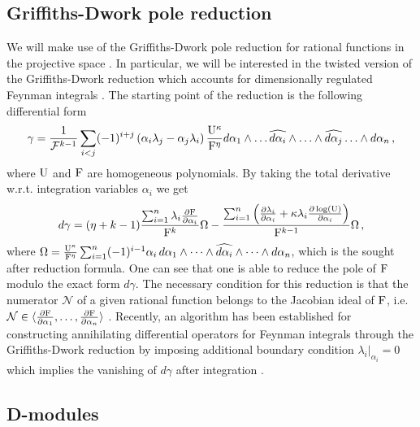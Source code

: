\documentclass[11pt]{article}
\begin{document}
\subsection{Griffiths-Dwork pole reduction}
We will make use of the Griffiths-Dwork pole reduction for rational functions in the projective space \cite{Griffiths_1969,Dwork1962,Dwork1964}. In particular, we will be interested in the twisted version of the Griffiths-Dwork reduction which accounts for dimensionally regulated Feynman integrals \cite{delaCruz:2024xit}.
The starting point of the reduction is the following differential form
\begin{align}
\gamma = \frac{1}{\mathcal{F}^{k-1}} \sum_{i<j} (-1)^{i+j} \left( \alpha_{i}\lambda_{j} - \alpha_{j}\lambda_{i} \right) \frac{{\rm U}^{\kappa}}{{\rm F}^{\eta}}  d\alpha_{1} \wedge \hdots \widehat{d\alpha_{i}} \wedge \hdots \wedge \widehat{d\alpha_{j}} \hdots \wedge d\alpha_{n} \,,   
\end{align}
where $\rm U$ and $\rm F$ are homogeneous polynomials.
By taking the total derivative w.r.t. integration variables $\alpha_{i}$ we get
\begin{align}\label{eq:twisted_griffiths}
d \gamma = (\eta + k-1)\frac{\sum_{i=1}^{n} \lambda_{i}\frac{\partial {\rm F}}{\partial \alpha_{i}} }{{\rm F}^{k}}\Omega -  \frac{\sum_{i=1}^{n} \left( \frac{\partial \lambda_{i}}{\partial \alpha_{i}} + \kappa \lambda_{i} \frac{\partial \log({\rm U})}{\partial \alpha_{i}} \right) }{{\rm F}^{k-1}}\Omega \,, 
\end{align}
where $\Omega = \frac{{\rm U}^{\kappa}}{{\rm F}^{\eta}}  \sum _{i=1}^{n} (-1)^{i-1}\alpha_{i} \, d\alpha_{1} \wedge \cdots \wedge \widehat{d\alpha_{i}} \wedge \cdots \wedge d\alpha_{n}$, which is the sought after reduction formula. One can see that one is able to reduce the pole of ${\rm F}$ modulo the exact form $d \gamma$. The necessary condition for this reduction is that the numerator $\mathcal{N}$ of a given rational function belongs to the Jacobian ideal of $\rm{F}$, i.e. $\mathcal{N} \in \langle \frac{\partial {\rm F}}{\partial \alpha_{1}}, \hdots ,  \frac{\partial {\rm F}}{\partial \alpha_{n}} \rangle$  .
Recently, an algorithm has been established for constructing annihilating differential operators for Feynman integrals through the Griffiths-Dwork reduction by imposing additional boundary condition $\lambda_{i} \vert_{\alpha_{i}} =0$ which implies the vanishing of $d \gamma$ after integration \cite{Chestnov:2025whi}. 

%
%
%

\subsection{D-modules}
\end{document}
